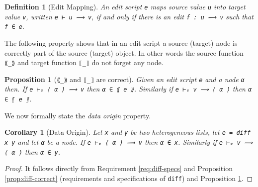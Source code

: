 \documentclass[preprint]{sigplanconf}
\theoremstyle{plain}
\newtheorem{definition}{Definition}
\newtheorem{prop}{Proposition}
\newtheorem{cor}{Corollary}
\begin{document}


\begin{definition}[Edit Mapping]
An edit script \texttt{e} maps source value \texttt{u} into
target value \texttt{v}, written \texttt{e ⊢ u ⟿ v}, if and
only if there is an edit \texttt{f : u ⟿ v} such that \texttt{f ∈ e}.
\end{definition}


The following property shows that in an edit script a source (target)
node is correctly part of the source (target) object.
%
In other words the source function \texttt{⟪\_⟫} and target function
\texttt{⟦\_⟧} do not forget any node.
\begin{prop}[\texttt{⟪\_⟫} and \texttt{⟦\_⟧} are correct]
\label{prop:source-target-cmp}
Given an edit script \texttt{e} and a node \texttt{α} then.
If \texttt{e ⊢ₑ ⟨ α ⟩ ⟿ v} then \texttt{α ∈ ⟪ e ⟫}.
Similarly if \texttt{e ⊢ₑ v ⟿ ⟨ α ⟩} then \texttt{α ∈ ⟦ e ⟧}.
\end{prop}

We now formally state the \emph{data origin} property.
\begin{cor}[Data Origin]
Let \texttt{x} and \texttt{y} be two heterogeneous lists, let \texttt{e = diff x y}
and let \texttt{α} be a node.
If \texttt{e ⊢ₑ ⟨ α ⟩ ⟿ v} then \texttt{α ∈ x}. Similarly if \texttt{e ⊢ₑ v ⟿ ⟨ α ⟩}
then \texttt{α ∈ y}.
\end{cor}    
\begin{proof}
  It follows directly from Requirement \ref{req:diff-specs} and Proposition
  \ref{prop:diff-correct} (requirements and specifications of
  \texttt{diff}) and Proposition \ref{prop:source-target-cmp}.
\end{proof}
\end{document}

